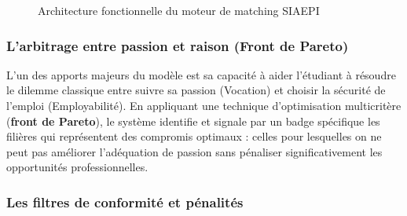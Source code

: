 \begin{figure}[H]
\caption{Architecture fonctionnelle du moteur de matching SIAEPI}
\label{fig:moteur_siaepi}
\end{figure}

\subsubsection{L'arbitrage entre passion et raison (Front de Pareto)}

L'un des apports majeurs du modèle est sa capacité à aider l'étudiant à résoudre le dilemme classique entre suivre sa passion (Vocation) et choisir la sécurité de l'emploi (Employabilité). En appliquant une technique d'optimisation multicritère (\textbf{front de Pareto}), le système identifie et signale par un badge spécifique les filières qui représentent des compromis optimaux : celles pour lesquelles on ne peut pas améliorer l'adéquation de passion sans pénaliser significativement les opportunités professionnelles.

\subsubsection{Les filtres de conformité et pénalités}

